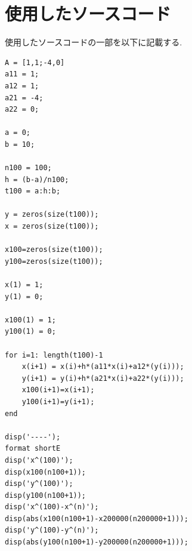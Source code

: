 \documentclass[11pt]{jsarticle}
\begin{document}
\clearpage

\section{使用したソースコード}
使用したソースコードの一部を以下に記載する. 
\begin{lstlisting}[caption={表3 \ $N = 100$ の場合},style=MATLABStyle]
A = [1,1;-4,0]
a11 = 1;
a12 = 1;
a21 = -4;
a22 = 0;

a = 0;
b = 10;

n100 = 100;
h = (b-a)/n100;
t100 = a:h:b;

y = zeros(size(t100));
x = zeros(size(t100));

x100=zeros(size(t100));
y100=zeros(size(t100));

x(1) = 1;
y(1) = 0;

x100(1) = 1;
y100(1) = 0;

for i=1: length(t100)-1
    x(i+1) = x(i)+h*(a11*x(i)+a12*(y(i)));
    y(i+1) = y(i)+h*(a21*x(i)+a22*(y(i)));
    x100(i+1)=x(i+1);
    y100(i+1)=y(i+1);
end

disp('----');
format shortE
disp('x^(100)');
disp(x100(n100+1));
disp('y^(100)');
disp(y100(n100+1));
disp('x^(100)-x^(n)');
disp(abs(x100(n100+1)-x200000(n200000+1)));
disp('y^(100)-y^(n)');
disp(abs(y100(n100+1)-y200000(n200000+1)));
\end{lstlisting}
\end{document}
